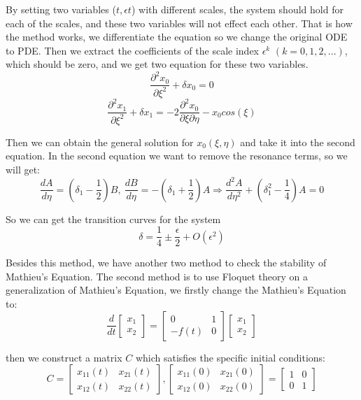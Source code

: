 \documentclass{article}
\begin{document}
By setting two variables ($t, \epsilon t$) with different scales, the system should hold for each of the scales, and these two variables will not effect each other. That is how the method works, we differentiate the equation so we change the original ODE to PDE. Then we extract the coefficients of the scale index $\epsilon^k$ $(k=0,1,2,...)$, which should be zero, and we get two equation for these two variables.
$$\frac{\partial^2 x_0}{\partial \xi^2} + \delta x_0 = 0$$
$$\frac{\partial^2 x_1}{\partial \xi^2} + \delta x_1 = - 2 \frac{\partial^2 x_0}{\partial \xi \partial \eta} - x_0 cos(\xi)$$

Then we can obtain the general solution for $x_0(\xi, \eta)$ and take it into the second equation. In the second equation we want to remove the resonance terms, so we will get: $$\frac{d A}{d \eta} = (\delta_1 - \frac{1}{2})B, \ \frac{d B}{d \eta} = - (\delta_1 + \frac{1}{2})A \Longrightarrow \frac{d^2 A}{d \eta^2} + (\delta_1^2 - \frac{1}{4})A = 0$$

So we can get the transition curves for the system 
$$\delta = \frac{1}{4} \pm \frac{\epsilon}{2} + O(\epsilon^2)$$

Besides this method, we have another two method to check the stability of Mathieu's Equation. The second method is to use Floquet theory on a generalization of Mathieu's Equation, we firstly change the Mathieu's Equation to:
$$\frac{d}{d t} \left[
  \begin{matrix}
  x_1 \\
  x_2
  \end{matrix}
  \right] = \left[
  \begin{matrix}
  0 & 1 \\
  -f(t) & 0
  \end{matrix}
  \right]\left[
  \begin{matrix}
  x_1 \\
  x_2
  \end{matrix}
  \right]$$
 
 then we construct a matrix $C$ which satisfies the specific initial conditions:
$$C = \left[\begin{matrix}
    x_{11}(t)&x_{21}(t)\\x_{12}(t)&x_{22}(t)
    \end{matrix}\right],  
    \left[\begin{matrix}
    x_{11}(0)&x_{21}(0)\\x_{12}(0)&x_{22}(0)
    \end{matrix}\right] =
    \left[\begin{matrix}
    1&0\\0&1
    \end{matrix}\right]$$
\end{document}
